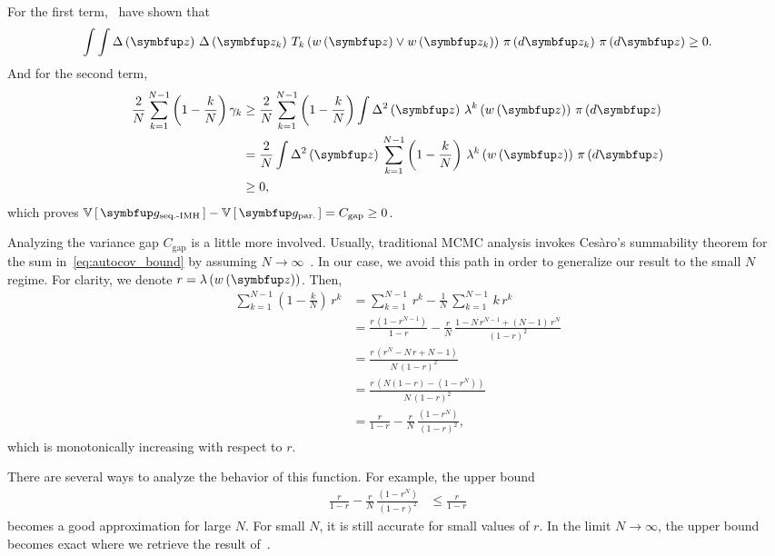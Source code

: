 \begin{proofEnd}
For the first term,~\citet[Theorem 3]{tan_monte_2006} have shown that
\begin{align}
  \int \int
  \Delta\left(\vz\right) \,
  \Delta\left(\vz_k\right) \,
  T_k\left(w\left(\vz\right) \vee w\left(\vz_k\right) \right) \, \pi\left(d\vz_k\right) \, \pi\left(d\vz\right)
  \geq
  0.
\end{align}
And for the second term,
\begin{align}
  \frac{2}{N} \sum_{k=1}^{N-1} \left(1 - \frac{k}{N}\right) \gamma_k
  &\geq
  \frac{2}{N} \sum_{k=1}^{N-1} \left(1 - \frac{k}{N}\right)
  \int
  \Delta^2\left(\vz\right) \, \lambda^k\left(w\left(\vz\right)\right) \, \pi\left(d\vz\right)
  \\
  &=
  \frac{2}{N}
  \int
  \Delta^2\left(\vz\right) \,
   \sum_{k=1}^{N-1} 
  \left(1 - \frac{k}{N}\right) \, \lambda^k\left(w\left(\vz\right)\right)
  \, \pi\left(d\vz\right)\label{eq:autocov_bound}  \\
  &\geq 0,
\end{align}
which proves \(\V{\vg_{\text{seq.-IMH}}} - \V{\vg_{\text{par.}}} = C_{\text{gap}} \geq 0\).

Analyzing the variance gap \(C_{\text{gap}}\) is a little more involved.
Usually, traditional MCMC analysis invokes Ces\`aro's summability theorem for the sum in~\cref{eq:autocov_bound} by assuming \(N \rightarrow \infty\)~\citep{kung_discussions_1994}.
In our case, we avoid this path in order to generalize our result to the small \(N\) regime.
For clarity, we denote \(r = \lambda\left(w\left(\vz\right)\right)\).
Then,
\begin{align}
 \sum_{k=1}^{N-1} \left(1 - \frac{k}{N}\right) \, r^k
 &=
 \sum_{k=1}^{N-1} \, r^k
 -
 \frac{1}{N}\,\sum_{k=1}^{N-1} \,k\, r^k
 \\
 &=
 \frac{r \, \left( 1 - r^{N-1} \right) }{1 - r} 
 -
 \frac{r}{N}
 \,
 \frac{1 - N\,r^{N-1} + \left(N-1\right)\,r^{N} }{{\left(1 - r\right)}^2} 
 \\
 &=
 \frac{
   r\,\left(r^N - N\,r + N - 1\right)
 }{
   N\,{\left(1-r\right)}^2
 }
 \\
 &=
 \frac{
   r\,\left( N \left(1-r\right) - \left(1-r^N\right) \right)
 }{
   N\,{\left(1-r\right)}^2
 }
 \\
 &=
 \frac{r}{1-r} -
 \frac{r}{N}\,\frac{\left(1-r^N\right)}{{\left(1-r\right)}^2},\label{eq:r_exact}
\end{align}
which is monotonically increasing with respect to \(r\).

There are several ways to analyze the behavior of this function.
For example, the upper bound 
\begin{align}
 \frac{r}{1-r} -
 \frac{r}{N}\,\frac{\left(1-r^N\right)}{{\left(1-r\right)}^2}
 &\leq
 \frac{r}{1-r}\label{eq:r_approx}
\end{align}
becomes a good approximation for large \(N\).
For small \(N\), it is still accurate for small values of \(r\).
In the limit \(N \rightarrow \infty\), the upper bound becomes exact where we retrieve the result of~\citet[Theorem 3]{tan_monte_2006}.


\end{proofEnd}

